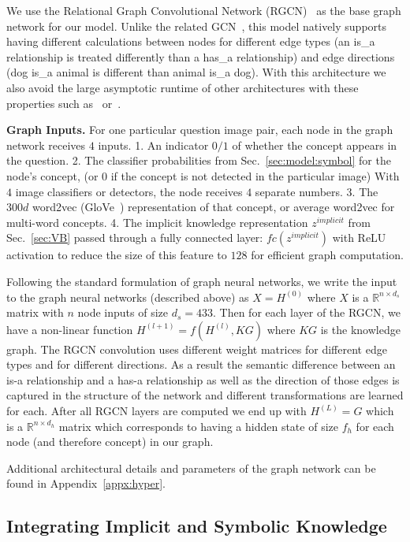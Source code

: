 \documentclass[final]{cvpr}
\providecommand{\myparagraph}[1]{\noindent\textbf{#1.}}
\providecommand{\sectionvspace}{\vspace{-0cm}}
\begin{document}
We use the Relational Graph Convolutional Network (RGCN)~\cite{schlichtkrull2018modeling} as the base graph network for our model. Unlike the related GCN~\cite{kipf2016semi}, this model natively supports having different calculations between nodes for different edge types (an is\_a relationship is treated differently than a has\_a relationship) and edge directions (dog is\_a animal is different than animal is\_a dog). With this architecture we also avoid the large asymptotic runtime of other architectures with these properties such as~\cite{Li16} or~\cite{velivckovic2017graph}.

\myparagraph{Graph Inputs} 
For one particular question image pair, each node in the graph network receives $4$ inputs. 
1. An indicator $0/1$ of whether the concept appears in the question.
2. The classifier probabilities from Sec.~\ref{sec:model:symbol} for the node's concept, (or $0$ if the concept is not detected in the particular image) 
With $4$ image classifiers or detectors, the node receives $4$ separate numbers. 3. The $300d$ word2vec (GloVe~\cite{pennington2014glove}) representation of that concept, or average word2vec for multi-word concepts. 4. The implicit knowledge representation $z^{implicit}$ from Sec.~\ref{sec:VB} passed through a fully connected layer: $fc(z^{implicit})$ with ReLU activation to reduce the size of this feature to $128$ for efficient graph computation.

Following the standard formulation of graph neural networks, we write the input to the graph neural networks (described above) as $X = H^{(0)}$ where $X$ is a $\mathbb{R}^{n \times d_s}$ matrix with $n$ node inputs of size $d_s=433$.
Then for each layer of the RGCN, we have a non-linear function $H^{(l+1)} = f(H^{(l)}, KG)$ where $KG$ is the knowledge graph. The RGCN convolution uses different weight matrices for different edge types and for different directions. As a result the semantic difference between an is-a relationship and a has-a relationship as well as the direction of those edges is captured in the structure of the network and different transformations are learned for each. After all RGCN layers are computed we end up with $H^{(L)} = G$ which is a $\mathbb{R}^{n \times d_h}$ matrix which corresponds to having a hidden state of size $f_h$ for each node (and therefore concept) in our graph.

Additional architectural details and parameters of the graph network can be found in Appendix~\ref{appx:hyper}.

\sectionvspace
\subsection{Integrating Implicit and Symbolic Knowledge}
\label{sec:model:integration}
\sectionvspace
\end{document}
